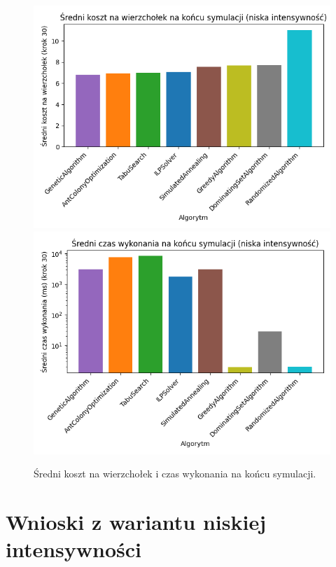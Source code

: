 \begin{figure}[H]
  \centering
  \includegraphics[width=0.48\linewidth]{assets/figures/final_step_cost.png}
  \includegraphics[width=0.48\linewidth]{assets/figures/final_step_time.png}
  \caption{Średni koszt na wierzchołek i czas wykonania na końcu symulacji.}
  \label{fig:dynamic_final_bars}
\end{figure}

\section{Wnioski z wariantu niskiej intensywności}

